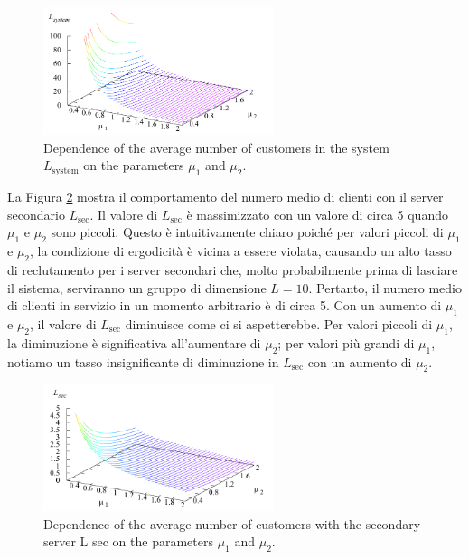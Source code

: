 \documentclass[11pt]{article}
\begin{document}
\begin{figure}[h]
    \centering
    \includegraphics[width=0.6\textwidth]{CBOSr9C.png}
    \caption{Dependence of the average number of customers in the system $L_\mathrm{system}$ on the parameters
    $\mu_1$ and $\mu_2$.}
    \label{fig:10}
\end{figure}

La Figura \ref{fig:11} mostra il comportamento del numero medio di clienti con il server
secondario $L_\mathrm{sec}$. Il valore di $L_\mathrm{sec}$ è massimizzato con un valore di circa 5 quando $\mu_1$ e $\mu_2$ sono piccoli. Questo è intuitivamente chiaro poiché per valori piccoli di $\mu_1$ e $\mu_2$, la condizione di ergodicità è vicina a essere violata, causando un alto tasso di reclutamento per i server secondari che, molto probabilmente prima di lasciare il sistema, serviranno un gruppo di dimensione $L = 10$. Pertanto, il numero medio di clienti in servizio in un momento arbitrario è di circa 5. Con un aumento di $\mu_1$ e $\mu_2$, il valore di $L_\mathrm{sec}$ diminuisce come ci si aspetterebbe. Per valori piccoli di $\mu_1$, la diminuzione è significativa all'aumentare di $\mu_2$; per valori più grandi di $\mu_1$, notiamo un tasso insignificante di diminuzione in $L_\mathrm{sec}$ con un aumento di $\mu_2$.

\begin{figure}[h]
    \centering
    \includegraphics[width=0.6\textwidth]{R1VGHAR.png}
    \caption{Dependence of the average number of customers with the secondary server L sec on the
    parameters $\mu_1$ and $\mu_2$.}
    \label{fig:11}
\end{figure}
\end{document}
